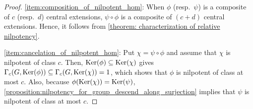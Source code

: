 
\begin{proof}
\eqref{item:composition_of_nilpotent_hom}: When $\phi$ (resp.\ $\psi$) is a composite of $c$ (resp.\ $d$) central extensions, $\psi\circ\phi$ is a composite of $(c+d)$ central extensions. Hence, it follows from \cref{theorem: characterization of relative nilpotency}.

\eqref{item:cancelation_of_nilpotent_hom}: Put $\chi=\psi\circ\phi$ and assume that $\chi$ is nilpotent of class $c$. Then, $\operatorname{Ker}(\phi) \subseteq \operatorname{Ker}(\chi)$ gives $\Gamma_c(G,\operatorname{Ker}(\phi)) \subseteq \Gamma_c(G,\operatorname{Ker}(\chi))=1$, which shows that $\phi$ is nilpotent of class at most $c$.
Also, because $\phi(\operatorname{Ker}(\chi))=\operatorname{Ker}(\psi)$, \cref{proposition:nilpotency_for_group_descend_along_surjection} implies that $\psi$ is nilpotent of class at most $c$.
\end{proof}





